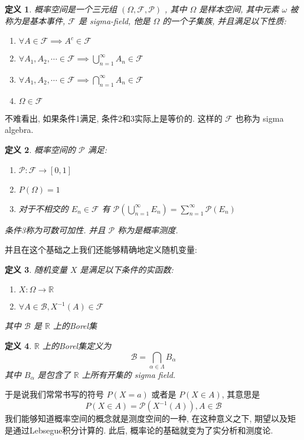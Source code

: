 \documentclass[a4paper, 10pt]{ctexart} %
\newtheorem{definition}{定义}
\begin{document}
\begin{definition}
概率空间是一个三元组 $\left(\Omega, \mathcal F , \mathcal P\right)$ , 其中 $\Omega $ 是样本空间, 其中元素 $\omega$ 被称为是基本事件, 
$\mathcal F$ 是 sigma-field, 他是 $\Omega  $ 的一个子集族, 并且满足以下性质:
\begin{enumerate}
\item[1.] $\forall  A \in \mathcal F \implies A ^{c} \in \mathcal F  $
\item[2.] $\forall A_1 , A_{2} , \cdots   \in \mathcal F \implies \bigcup _{n=1}^{\infty} A_{n} \in \mathcal F$ 
\item[3.] $\forall A_1 , A_{2} , \cdots  \in \mathcal F \implies \bigcap _{n=1}^{\infty} A_{n} \in \mathcal F$ 
\item[4.] $\Omega \in \mathcal F$ 
\end{enumerate}
\end{definition}
不难看出, 如果条件1满足, 条件2和3实际上是等价的. 这样的 $\mathcal F$ 也称为 sigma algebra. 
\begin{definition}
    概率空间的 $\mathcal P$ 满足:
\begin{enumerate}
    \item[1.] $\mathcal P : \mathcal F \to [0,1]$
    \item[2.] $P \left(\Omega\right) = 1$
    \item[3.] 对于不相交的 $E_{n} \in \mathcal F$ 有 $\mathcal P \left(\bigcup_{n=1}^{\infty}E_{n} \right) = \sum_{n=1} ^{\infty} \mathcal P \left(E_{n}\right)$
\end{enumerate} 
条件3称为可数可加性. 并且 $\mathcal P$ 称为是概率测度.
\end{definition}
并且在这个基础之上我们还能够精确地定义随机变量:
\begin{definition}
随机变量 $X$ 是满足以下条件的实函数:
\begin{enumerate}
    \item[1.] $X : \Omega \to \mathbb{R}$
    \item[2.] $\forall A \in \mathcal B ,  X ^{-1}  \left(A\right) \in \mathcal F$ 
\end{enumerate}
其中 $\mathcal B$ 是 $\mathbb{R}$ 上的Borel集
\end{definition}
\begin{definition}
$\mathbb{R}$ 上的Borel集定义为
\[
\mathcal B = \bigcap_{\alpha \in \Lambda} B_{\alpha} 
\]
其中 $B_{\alpha}$ 是包含了 $\mathbb{R}$ 上所有开集的 sigma field.
\end{definition}
于是说我们常常书写的符号 $P \left(X  = a\right)$ 或者是 $P \left(X  \in A\right)$, 其意思是
\[
P \left(X \in A \right) = \mathcal P \left(X ^{-1}  \left(A\right)\right) , A \in \mathcal B
\]
我们能够知道概率空间的概念就是测度空间的一种, 在这种意义之下, 期望以及矩是通过Lebsegue积分计算的. 此后, 概率论的基础就变为了实分析和测度论. 

\end{document}
